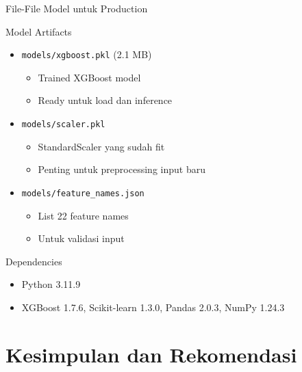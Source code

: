 \documentclass[aspectratio=169]{beamer}
\begin{document}
\begin{frame}{File-File Model untuk Production}
\begin{block}{Model Artifacts}
\begin{itemize}
    \item \texttt{models/xgboost.pkl} (2.1 MB)
    \begin{itemize}
        \item Trained XGBoost model
        \item Ready untuk load dan inference
    \end{itemize}
    
    \item \texttt{models/scaler.pkl}
    \begin{itemize}
        \item StandardScaler yang sudah fit
        \item Penting untuk preprocessing input baru
    \end{itemize}
    
    \item \texttt{models/feature\_names.json}
    \begin{itemize}
        \item List 22 feature names
        \item Untuk validasi input
    \end{itemize}
\end{itemize}
\end{block}

\begin{block}{Dependencies}
\begin{itemize}
    \item Python 3.11.9
    \item XGBoost 1.7.6, Scikit-learn 1.3.0, Pandas 2.0.3, NumPy 1.24.3
\end{itemize}
\end{block}
\end{frame}

\section{Kesimpulan dan Rekomendasi}
\end{document}

